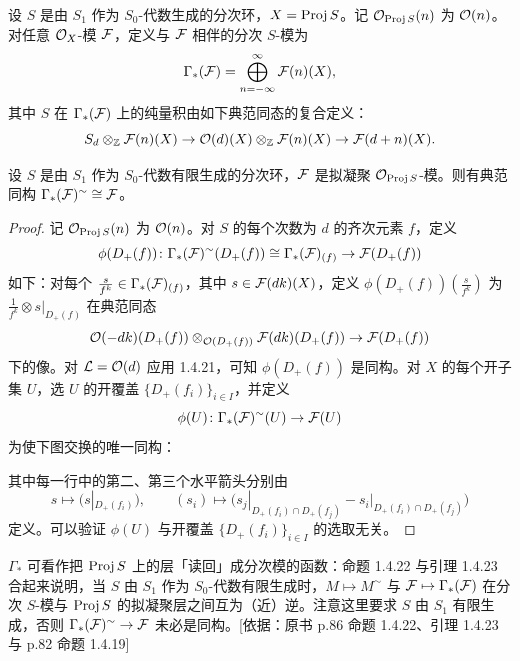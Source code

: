 设 $S$ 是由 $S_1$ 作为 $S_0$-代数生成的分次环，$X=\operatorname{Proj} S$。记 $\mathcal{O}_{\operatorname{Proj} S}(n)$ 为 $\mathcal{O}(n)$。对任意 $\mathcal{O}_X$-模 $\mathcal{F}$，定义与 $\mathcal{F}$ 相伴的分次 $S$-模为
\[
\Gamma_*(\mathcal{F})=\bigoplus_{n=-\infty}^\infty\mathcal{F}(n)(X),
\]
其中 $S$ 在 $\Gamma_*(\mathcal{F})$ 上的纯量积由如下典范同态的复合定义：
\[
S_d\otimes_{\mathbb{Z}}\mathcal{F}(n)(X)\to\mathcal{O}(d)(X)\otimes_{\mathbb{Z}}\mathcal{F}(n)(X)\to\mathcal{F}(d+n)(X).
\]

\begin{proposition}\label{it:1.4.22}
设 $S$ 是由 $S_1$ 作为 $S_0$-代数有限生成的分次环，$\mathcal{F}$ 是拟凝聚 $\mathcal{O}_{\operatorname{Proj} S}$-模。则有典范同构 $\Gamma_*(\mathcal{F})^\sim\cong\mathcal{F}$。
\end{proposition}

\begin{proof}
记 $\mathcal{O}_{\operatorname{Proj} S}(n)$ 为 $\mathcal{O}(n)$。对 $S$ 的每个次数为 $d$ 的齐次元素 $f$，定义
\[
\phi(D_+(f))\colon\Gamma_*(\mathcal{F})^\sim(D_+(f))\cong\Gamma_*(\mathcal{F})_{(f)}\to\mathcal{F}(D_+(f))
\]
如下：对每个 $\frac{s}{f^k}\in\Gamma_*(\mathcal{F})_{(f)}$，其中 $s\in\mathcal{F}(dk)(X)$，定义 $\phi(D_+(f))(\frac{s}{f^k})$ 为 $\frac{1}{f^k}\otimes s|_{D_+(f)}$ 在典范同态
\[
\mathcal{O}(-dk)(D_+(f))\otimes_{\mathcal{O}(D_+(f))}\mathcal{F}(dk)(D_+(f))\to\mathcal{F}(D_+(f))
\]
下的像。对 $\mathcal{L}=\mathcal{O}(d)$ 应用 1.4.21，可知 $\phi(D_+(f))$ 是同构。对 $X$ 的每个开子集 $U$，选 $U$ 的开覆盖 $\{D_+(f_i)\}_{i\in I}$，并定义
\[
\phi(U)\colon\Gamma_*(\mathcal{F})^\sim(U)\to\mathcal{F}(U)
\]
为使下图交换的唯一同构：
\begin{center}
\end{center}
其中每一行中的第二、第三个水平箭头分别由
\[
s\mapsto\bigl(s|_{D_+(f_i)}\bigr),\qquad
(s_i)\mapsto\bigl(s_j|_{D_+(f_i)\cap D_+(f_j)}-s_i|_{D_+(f_i)\cap D_+(f_j)}\bigr)
\]
定义。可以验证 $\phi(U)$ 与开覆盖 $\{D_+(f_i)\}_{i\in I}$ 的选取无关。
\end{proof}

\begin{tnote}
$\Gamma_*$ 可看作把 $\operatorname{Proj} S$ 上的层「读回」成分次模的函数：命题 1.4.22 与引理 1.4.23 合起来说明，当 $S$ 由 $S_1$ 作为 $S_0$-代数有限生成时，$M\mapsto M^\sim$ 与 $\mathcal{F}\mapsto\Gamma_*(\mathcal{F})$ 在分次 $S$-模与 $\operatorname{Proj} S$ 的拟凝聚层之间互为（近）逆。注意这里要求 $S$ 由 $S_1$ 有限生成，否则 $\Gamma_*(\mathcal{F})^\sim\to\mathcal{F}$ 未必是同构。[依据：原书 p.86 命题 1.4.22、引理 1.4.23 与 p.82 命题 1.4.19]
\end{tnote}

